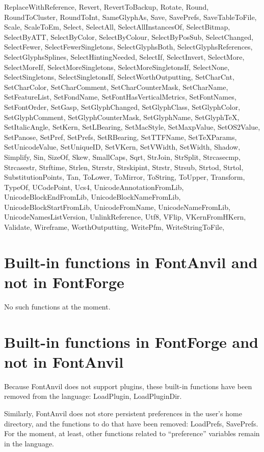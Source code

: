 \documentclass[11pt]{report}
\begin{document}
ReplaceWithReference,
Revert,
RevertToBackup,
Rotate,
Round,
RoundToCluster,
RoundToInt,
SameGlyphAs,
Save,
SavePrefs,
SaveTableToFile,
Scale,
ScaleToEm,
Select,
SelectAll,
SelectAllInstancesOf,
SelectBitmap,
SelectByATT,
SelectByColor,
SelectByColour,
SelectByPosSub,
SelectChanged,
SelectFewer,
SelectFewerSingletons,
SelectGlyphsBoth,
SelectGlyphsReferences,
SelectGlyphsSplines,
SelectHintingNeeded,
SelectIf,
SelectInvert,
SelectMore,
SelectMoreIf,
SelectMoreSingletons,
SelectMoreSingletonsIf,
SelectNone,
SelectSingletons,
SelectSingletonsIf,
SelectWorthOutputting,
SetCharCnt,
SetCharColor,
SetCharComment,
SetCharCounterMask,
SetCharName,
SetFeatureList,
SetFondName,
SetFontHasVerticalMetrics,
SetFontNames,
SetFontOrder,
SetGasp,
SetGlyphChanged,
SetGlyphClass,
SetGlyphColor,
SetGlyphComment,
SetGlyphCounterMask,
SetGlyphName,
SetGlyphTeX,
SetItalicAngle,
SetKern,
SetLBearing,
SetMacStyle,
SetMaxpValue,
SetOS2Value,
SetPanose,
SetPref,
SetPrefs,
SetRBearing,
SetTTFName,
SetTeXParams,
SetUnicodeValue,
SetUniqueID,
SetVKern,
SetVWidth,
SetWidth,
Shadow,
Simplify,
Sin,
SizeOf,
Skew,
SmallCaps,
Sqrt,
StrJoin,
StrSplit,
Strcasecmp,
Strcasestr,
Strftime,
Strlen,
Strrstr,
Strskipint,
Strstr,
Strsub,
Strtod,
Strtol,
SubstitutionPoints,
Tan,
ToLower,
ToMirror,
ToString,
ToUpper,
Transform,
TypeOf,
UCodePoint,
Ucs4,
UnicodeAnnotationFromLib,
UnicodeBlockEndFromLib,
UnicodeBlockNameFromLib,
UnicodeBlockStartFromLib,
UnicodeFromName,
UnicodeNameFromLib,
UnicodeNamesListVersion,
UnlinkReference,
Utf8,
VFlip,
VKernFromHKern,
Validate,
Wireframe,
WorthOutputting,
WritePfm,
WriteStringToFile,

\section{Built-in functions in FontAnvil and not in FontForge}

No such functions at the moment.

\section{Built-in functions in FontForge and not in FontAnvil}

Because FontAnvil does not support plugins, these built-in functions have
been removed from the language:  LoadPlugin, LoadPluginDir.

Similarly, FontAnvil does not store persistent preferences in the user's
home directory, and the functions to do that have been removed: LoadPrefs,
SavePrefs.  For the moment, at least, other functions related to
``preference'' variables remain in the language.
\end{document}
